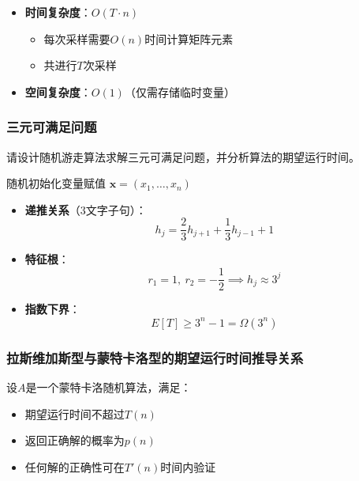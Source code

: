 \documentclass[./../main.tex]{subfiles} %
\begin{document}
\begin{itemize}
    \item \textbf{时间复杂度}：$O(T \cdot n)$
    \begin{itemize}
        \item 每次采样需要$O(n)$时间计算矩阵元素
        \item 共进行$T$次采样
    \end{itemize}
    \item \textbf{空间复杂度}：$O(1)$（仅需存储临时变量）
\end{itemize}

\subsubsection{三元可满足问题}
请设计随机游走算法求解三元可满足问题，并分析算法的期望运行时间。

\begin{algorithm}[H]
\SetAlgoLined
{}
随机初始化变量赋值 $\mathbf{x} = (x_1, \dots, x_n)$\;
\;
\end{algorithm}

\begin{itemize}
    \item \textbf{递推关系}（3文字子句）：
    $$
    h_j = \frac{2}{3}h_{j+1} + \frac{1}{3}h_{j-1} + 1
    $$
    
    \item \textbf{特征根}：
    $$
    r_1 = 1, \ r_2 = -\frac{1}{2} \implies h_j \approx 3^j
    $$
    
    \item \textbf{指数下界}：
    $$
    E[T] \geq 3^n - 1 = \Omega(3^n)
    $$
\end{itemize}


\subsubsection{拉斯维加斯型与蒙特卡洛型的期望运行时间推导关系}

设$A$是一个蒙特卡洛随机算法，满足：
\begin{itemize}
    \item 期望运行时间不超过$T(n)$
    \item 返回正确解的概率为$p(n)$
    \item 任何解的正确性可在$T'(n)$时间内验证
\end{itemize}
\end{document}
